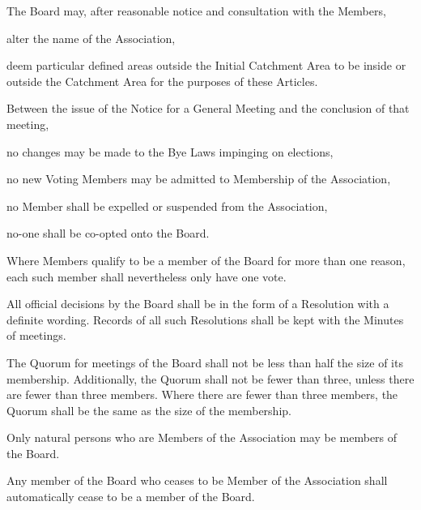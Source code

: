\documentclass[10pt]{mk-articles-of-association}
\newcommand{\EC}[0]{Board}
\newcommand{\Exec}[0]{\EC{} }
\begin{document}
\begin{constenum}
\begin{constenum}
    \end{constenum}

  \item The \Exec may, after reasonable notice and consultation with the
    Members,
    \begin{constenum}
    \item alter the name of the Association, \ITor
    \item deem particular defined areas outside the Initial Catchment Area
      to be inside or outside the Catchment Area
      for the purposes of these Articles.
    \end{constenum}

  \item Between the issue of the Notice for a General Meeting and
    the conclusion of that meeting,
    \begin{constenum}
      \item no changes may be made to the Bye Laws impinging on elections,
      \item no new Voting Members may be admitted to Membership of
        the Association,
      \item no Member shall be expelled or suspended from the Association, \ITand
      \item no-one shall be co-opted onto the \EC{}.
    \end{constenum}

  \item Where Members qualify to be a member of the \Exec for more
    than one reason, each such member shall nevertheless only have
    one vote.

  \item All official decisions by the \Exec shall be in the form of a
    Resolution with a definite wording. Records of
    all such Resolutions shall be kept with the
    Minutes of meetings.

  \item The Quorum for meetings of the \Exec shall not be less than
    half the size of its membership. Additionally, the Quorum shall
    not be fewer than three, unless there are fewer than three
    members. Where there are fewer than three members, the Quorum shall
    be the same as the size of the membership.

  \item Only natural persons who are Members of the Association
    may be members of the \EC{}.

  \item Any member of the \Exec who ceases to be Member of the Association
    shall automatically cease to be a member of the \EC{}.


\end{constenum}
\end{document}
